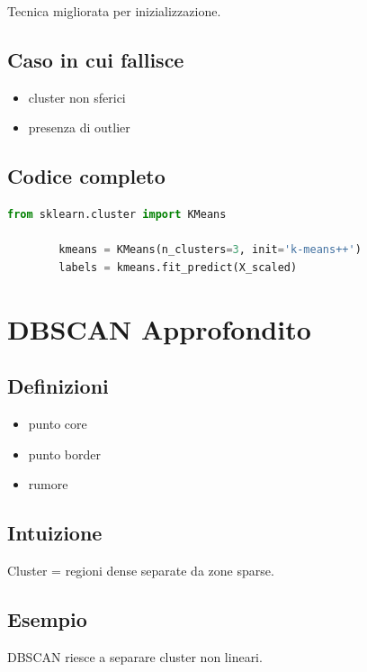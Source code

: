 \documentclass[12pt,a4paper]{article}
\begin{document}
	Tecnica migliorata per inizializzazione.
	
	\subsection{Caso in cui fallisce}
	
	\begin{itemize}
		\item cluster non sferici
		\item presenza di outlier
	\end{itemize}
	
	\subsection{Codice completo}
	
	\begin{lstlisting}[language=Python]
		from sklearn.cluster import KMeans
		
		kmeans = KMeans(n_clusters=3, init='k-means++')
		labels = kmeans.fit_predict(X_scaled)
	\end{lstlisting}
	
	\section{DBSCAN Approfondito}
	
	\subsection{Definizioni}
	
	\begin{itemize}
		\item punto core
		\item punto border
		\item rumore
	\end{itemize}
	
	\subsection{Intuizione}
	
	Cluster = regioni dense separate da zone sparse.
	
	\subsection{Esempio}
	
	DBSCAN riesce a separare cluster non lineari.
	
\end{document}
